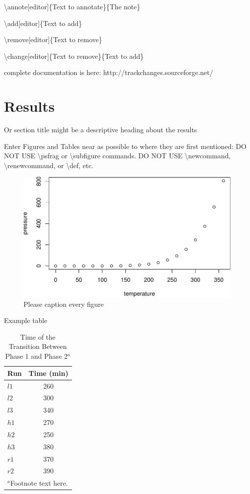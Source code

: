 \documentclass[draft,linenumbers]{agujournal2018}
\begin{document}
\textbackslash{}annote{[}editor{]}\{Text to annotate\}\{The note\}

\textbackslash{}add{[}editor{]}\{Text to add\}

\textbackslash{}remove{[}editor{]}\{Text to remove\}

\textbackslash{}change{[}editor{]}\{Text to remove\}\{Text to add\}

complete documentation is here: http://trackchanges.sourceforge.net/

\section{Results}

Or section title might be a descriptive heading about the results

Enter Figures and Tables near as possible to where they are first
mentioned: DO NOT USE \textbackslash{}psfrag or
\textbackslash{}subfigure commands. DO NOT USE
\textbackslash{}newcommand, \textbackslash{}renewcommand, or
\textbackslash{}def, etc.

\begin{figure}[h]
\includegraphics{article_template_agu_article_files/figure-latex/unnamed-chunk-2-1} \caption{Please caption every figure}\label{fig:unnamed-chunk-2}
\end{figure}

Example table

\begin{table}
 \caption{Time of the Transition Between Phase 1 and Phase 2$^{a}$}
 \centering
 \begin{tabular}{l c}
 \hline
  Run  & Time (min)  \\
 \hline
   $l1$  & 260   \\
   $l2$  & 300   \\
   $l3$  & 340   \\
   $h1$  & 270   \\
   $h2$  & 250   \\
   $h3$  & 380   \\
   $r1$  & 370   \\
   $r2$  & 390   \\
 \hline
 \multicolumn{2}{l}{$^{a}$Footnote text here.}
 \end{tabular}
 \end{table}
\end{document}
